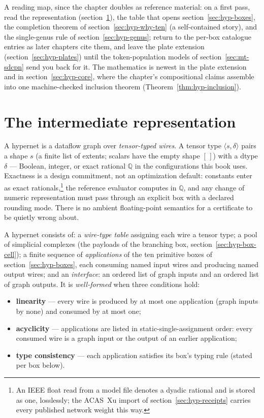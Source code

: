A reading map, since the chapter doubles as reference material: on a
first pass, read the representation (section~\ref{sec:hyp-ir}), the
table that opens section~\ref{sec:hyp-boxes}, the completion theorem
of section~\ref{sec:hyp-why-ten} (a self-contained story), and the
single-genus rule of section~\ref{sec:hyp-genus}; return to the
per-box catalogue entries as later chapters cite them, and leave the
plate extension (section~\ref{sec:hyp-plates}) until the
token-population models of section~\ref{sec:mt-sdcpn} send you back
for it. The mathematics is newest in the plate extension and in
section~\ref{sec:hyp-core}, where the chapter's compositional claims
assemble into one machine-checked inclusion theorem
(Theorem~\ref{thm:hyp-inclusion}).

\section{The intermediate representation}
\label{sec:hyp-ir}

A hypernet is a dataflow graph over \emph{tensor-typed wires}. A
tensor type $\langle s, \delta \rangle$ pairs a shape $s$ (a finite
list of extents; scalars have the empty shape $[\,]$) with a dtype
$\delta$ --- Boolean, integer, or exact rational $\mathbb{Q}$ in the
configurations this book uses. Exactness is a design commitment, not
an optimization default: constants enter as exact
rationals,\footnote{An IEEE float read from a model file denotes a
dyadic rational and is stored as one, losslessly; the ACAS~Xu import
of section~\ref{sec:hyp-receipts} carries every published network
weight this way.} the reference evaluator computes in $\mathbb{Q}$,
and any change of numeric representation must pass through an
explicit box with a declared rounding mode. There is no ambient
floating-point semantics for a certificate to be quietly wrong
about.

\begin{definition}[hypernet]
\label{def:hypernet}
A hypernet consists of: a \emph{wire-type table} assigning each wire
a tensor type; a pool of simplicial complexes (the payloads of the
branching box, section~\ref{sec:hyp-box-cell}); a finite sequence of
\emph{applications} of the ten primitive boxes of
section~\ref{sec:hyp-boxes}, each consuming named input wires and
producing named output wires; and an \emph{interface}: an ordered
list of graph inputs and an ordered list of graph outputs. It is
\emph{well-formed} when three conditions hold:
\begin{itemize}
\item \textbf{linearity} --- every wire is produced by at most one
  application (graph inputs by none) and consumed by at most one;
\item \textbf{acyclicity} --- applications are listed in
  static-single-assignment order: every consumed wire is a graph
  input or the output of an earlier application;
\item \textbf{type consistency} --- each application satisfies its
  box's typing rule (stated per box below).
\end{itemize}
\end{definition}

